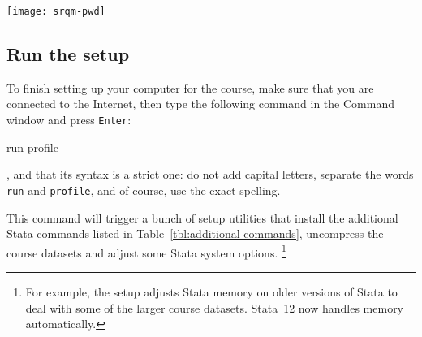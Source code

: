 		\texttt{[image: srqm-pwd]}\\[1em]
  
  \subsection{Run the \SRQM setup}%
		\label{sec:setup}%

	To finish setting up your computer for the course, make sure that you are connected to the Internet, then type the following command in the Command window and press \texttt{Enter}:%
		
		\begin{docspec}
			run profile
		\end{docspec}
	
	, and that its syntax is a strict one: do not add capital letters, separate the words \texttt{run} and \texttt{profile}, and of course, use the exact spelling.%
	
	This command will trigger a bunch of setup utilities that install the additional Stata commands listed in Table~\ref{tbl:additional-commands}, uncompress the course datasets and adjust some Stata system options.%
		\footnote{For example, the setup adjusts Stata memory on older versions of Stata to deal with some of the larger course datasets. Stata~12 now handles memory automatically.} %
		
	\bigskip
 
